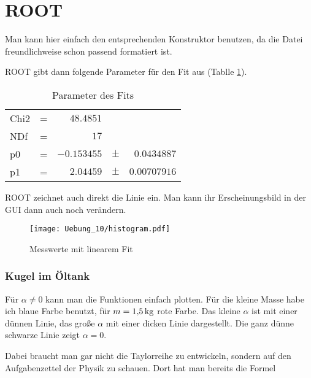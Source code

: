 
\part{ROOT}

Man kann hier einfach den entsprechenden Konstruktor benutzen, da die Datei freundlichweise schon passend formatiert ist.


ROOT gibt dann folgende Parameter für den Fit aus (Tablle \ref{table:fit}).

\begin{table}[h]
\begin{center}
\begin{tabular}{lcrcr}
Chi2 & = & $48.4851$ &  \\ 
NDf & = & $17$ &  \\ 
p0 & = & $-0.153455$ & $\pm$ & $0.0434887$ \\ 
p1 & = & $2.04459$ & $\pm$ & $0.00707916$ \\ 
\end{tabular} 
\caption{Parameter des Fits}
\label{table:fit}
\end{center}
\end{table}

ROOT zeichnet auch direkt die Linie ein. Man kann ihr Erscheinungsbild in der GUI dann auch noch verändern.


\begin{figure}[h]
\begin{center}
\texttt{[image: Uebung\_10/histogram.pdf]}
\caption{Messwerte mit linearem Fit}
\end{center}
\end{figure}

\section{Kugel im Öltank}

Für $\alpha \neq 0$ kann man die Funktionen einfach plotten. Für die kleine Masse habe ich blaue Farbe benutzt, für $m=\unit[1{,}5]{kg}$ rote Farbe. Das kleine $\alpha$ ist mit einer dünnen Linie, das große $\alpha$ mit einer dicken Linie dargestellt. Die ganz dünne schwarze Linie zeigt $\alpha = 0$.

Dabei braucht man gar nicht die Taylorreihe zu entwickeln, sondern auf den Aufgabenzettel der Physik zu schauen. Dort hat man bereits die Formel

